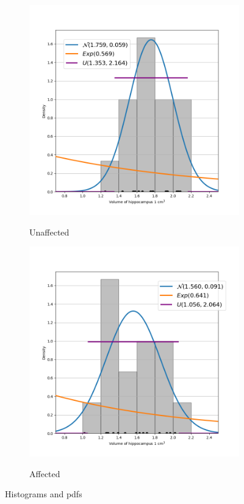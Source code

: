 \documentclass[12pt,a4paper]{article} %
\begin{document}
\begin{figure}[H]
\centering
\begin{subfigure}{0.48\textwidth}
  \centering
  \includegraphics[scale=0.4]{./img/unaffected_distributions.png}
  \label{fig:unaff_dists}
  \caption{Unaffected}
\end{subfigure}
\begin{subfigure}{0.48\textwidth}
  \centering
  \includegraphics[scale=0.4]{./img/affected_distributions.png}
  \label{fig:aff_dists}
  \caption{Affected}
\end{subfigure}
  \caption{Histograms and pdfs}
\end{figure}
\end{document}
